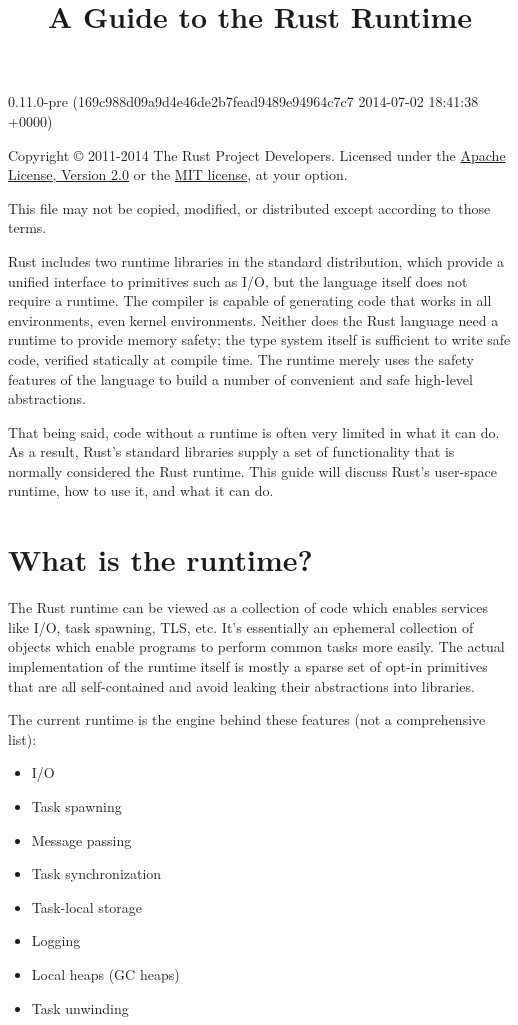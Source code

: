 \documentclass[]{article}
\title{A Guide to the Rust Runtime}
\begin{document}
\maketitle

0.11.0-pre (169c988d09a9d4e46de2b7fead9489e94964c7c7 2014-07-02 18:41:38 +0000)

Copyright © 2011-2014 The Rust Project Developers. Licensed under the
\href{http://www.apache.org/licenses/LICENSE-2.0}{Apache License,
Version 2.0} or the \href{http://opensource.org/licenses/MIT}{MIT
license}, at your option.

This file may not be copied, modified, or distributed except according
to those terms.

{
\hypersetup{linkcolor=black}
\setcounter{tocdepth}{3}
\tableofcontents
}
Rust includes two runtime libraries in the standard distribution, which
provide a unified interface to primitives such as I/O, but the language
itself does not require a runtime. The compiler is capable of generating
code that works in all environments, even kernel environments. Neither
does the Rust language need a runtime to provide memory safety; the type
system itself is sufficient to write safe code, verified statically at
compile time. The runtime merely uses the safety features of the
language to build a number of convenient and safe high-level
abstractions.

That being said, code without a runtime is often very limited in what it
can do. As a result, Rust's standard libraries supply a set of
functionality that is normally considered the Rust runtime. This guide
will discuss Rust's user-space runtime, how to use it, and what it can
do.

\section{What is the runtime?}\label{what-is-the-runtime}

The Rust runtime can be viewed as a collection of code which enables
services like I/O, task spawning, TLS, etc. It's essentially an
ephemeral collection of objects which enable programs to perform common
tasks more easily. The actual implementation of the runtime itself is
mostly a sparse set of opt-in primitives that are all self-contained and
avoid leaking their abstractions into libraries.

The current runtime is the engine behind these features (not a
comprehensive list):

\begin{itemize}
\itemsep1pt\parskip0pt
\item
  I/O
\item
  Task spawning
\item
  Message passing
\item
  Task synchronization
\item
  Task-local storage
\item
  Logging
\item
  Local heaps (GC heaps)
\item
  Task unwinding
\end{itemize}
\end{document}
